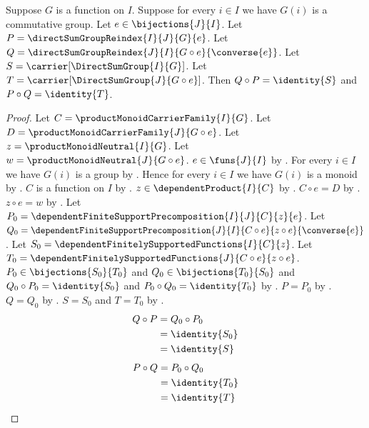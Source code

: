 \begin{theorem}\label{bijective_direct_sum_group_reindex_inverse}
    Suppose $G$ is a function on $I$.
    Suppose for every $i\in I$ we have $G(i)$ is a commutative group.
    Let $e\in\bijections{J}{I}$.
    Let $P=\directSumGroupReindex{I}{J}{G}{e}$.
    Let $Q=\directSumGroupReindex{J}{I}{G\circ e}{\converse{e}}$.
    Let $S=\carrier[\DirectSumGroup{I}{G}]$.
    Let $T=\carrier[\DirectSumGroup{J}{G\circ e}]$.
    Then $Q\circ P=\identity{S}$ and $P\circ Q=\identity{T}$.
\end{theorem}
\begin{proof}
    Let $C=\productMonoidCarrierFamily{I}{G}$.
    Let $D=\productMonoidCarrierFamily{J}{G\circ e}$.
    Let $z=\productMonoidNeutral{I}{G}$.
    Let $w=\productMonoidNeutral{J}{G\circ e}$.
    $e\in\funs{J}{I}$ by .
    For every $i\in I$ we have $G(i)$ is a group by
        .
    Hence for every $i\in I$ we have $G(i)$ is a monoid by
        .
    $C$ is a function on $I$ by
        .
    $z\in\dependentProduct{I}{C}$ by
        .
    $C\circ e=D$ by
        .
    $z\circ e=w$ by .
    Let $P_0=\dependentFiniteSupportPrecomposition{I}{J}{C}{z}{e}$.
    Let $Q_0=\dependentFiniteSupportPrecomposition
        {J}{I}{C\circ e}{z\circ e}{\converse{e}}$.
    Let $S_0=\dependentFinitelySupportedFunctions{I}{C}{z}$.
    Let $T_0=\dependentFinitelySupportedFunctions
        {J}{C\circ e}{z\circ e}$.
    $P_0\in\bijections{S_0}{T_0}$ and
        $Q_0\in\bijections{T_0}{S_0}$ and
        $Q_0\circ P_0=\identity{S_0}$ and
        $P_0\circ Q_0=\identity{T_0}$ by
        .
    $P=P_0$ by .
    $Q=Q_0$ by .
    $S=S_0$ and $T=T_0$ by
        .
    \begin{align*}
        Q\circ P
            &= Q_0\circ P_0
            \\
            &= \identity{S_0}
            \\
            &= \identity{S}
    \end{align*}
    \begin{align*}
        P\circ Q
            &= P_0\circ Q_0
            \\
            &= \identity{T_0}
            \\
            &= \identity{T}
    \end{align*}
\end{proof}

